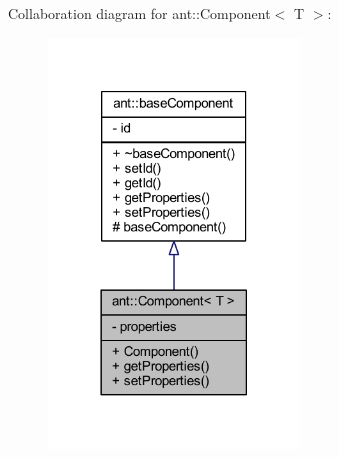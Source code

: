 Collaboration diagram for ant\+:\+:Component$<$ T $>$\+:
\nopagebreak
\begin{figure}[H]
\begin{center}
\leavevmode
\includegraphics[width=189pt]{db/d35/classant_1_1_component__coll__graph}
\end{center}
\end{figure}
